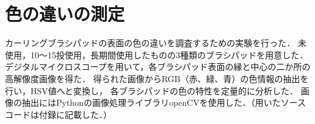 \documentclass[main]{subfiles}
\begin{document}
\section{色の違いの測定}
カーリングブラシパッドの表面の色の違いを調査するための実験を行った．
未使用，10～15投使用，長期間使用したものの3種類のブラシパッドを用意した．
デジタルマイクロスコープを用いて，各ブラシパッド表面の縁と中心の二か所の高解像度画像を得た．
得られた画像からRGB（赤、緑、青）の色情報の抽出を行い，HSV値へと変換し，
各ブラシパッドの色の特性を定量的に分析した．
画像の抽出にはPythonの画像処理ライブラリopenCVを使用した．（用いたソースコードは付録に記載した．）
\end{document}
